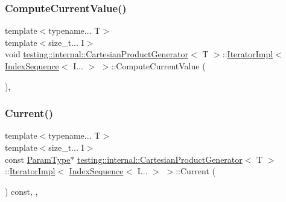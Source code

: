 \subsubsection{\texorpdfstring{Compute\+Current\+Value()}{ComputeCurrentValue()}}
{\footnotesize\ttfamily template$<$typename... T$>$ \\
template$<$size\+\_\+t... I$>$ \\
void \hyperlink{classtesting_1_1internal_1_1CartesianProductGenerator}{testing\+::internal\+::\+Cartesian\+Product\+Generator}$<$ T $>$\+::\hyperlink{classtesting_1_1internal_1_1CartesianProductGenerator_1_1IteratorImpl}{Iterator\+Impl}$<$ \hyperlink{structtesting_1_1internal_1_1IndexSequence}{Index\+Sequence}$<$ I... $>$ $>$\+::Compute\+Current\+Value (\begin{DoxyParamCaption}{ }\end{DoxyParamCaption})\hspace{0.3cm}{\ttfamily [inline]}, {\ttfamily [private]}}

\mbox{\label{classtesting_1_1internal_1_1CartesianProductGenerator_1_1IteratorImpl_3_01IndexSequence_3_01I_8_8_8_01_4_01_4_ab7052f320ab8ff3113a3e744a1bff07e}} 
\subsubsection{\texorpdfstring{Current()}{Current()}}
{\footnotesize\ttfamily template$<$typename... T$>$ \\
template$<$size\+\_\+t... I$>$ \\
const \hyperlink{classtesting_1_1internal_1_1CartesianProductGenerator_af27131157a9347f0c82420ca081ee7dd}{Param\+Type}$\ast$ \hyperlink{classtesting_1_1internal_1_1CartesianProductGenerator}{testing\+::internal\+::\+Cartesian\+Product\+Generator}$<$ T $>$\+::\hyperlink{classtesting_1_1internal_1_1CartesianProductGenerator_1_1IteratorImpl}{Iterator\+Impl}$<$ \hyperlink{structtesting_1_1internal_1_1IndexSequence}{Index\+Sequence}$<$ I... $>$ $>$\+::Current (\begin{DoxyParamCaption}{ }\end{DoxyParamCaption}) const\hspace{0.3cm}{\ttfamily [inline]}, {\ttfamily [override]}, {\ttfamily [virtual]}}



